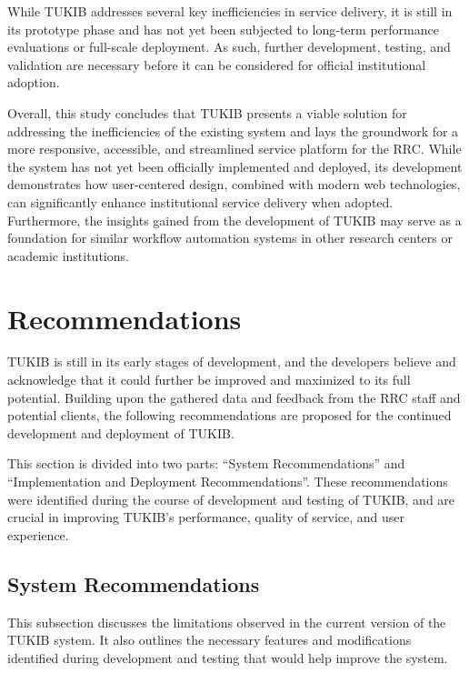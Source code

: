 While TUKIB addresses several key inefficiencies in service delivery, it is still in its prototype phase and has not yet been subjected to long-term performance evaluations or full-scale deployment. As such, further development, testing, and validation are necessary before it can be considered for official institutional adoption.

Overall, this study concludes that TUKIB presents a viable solution for addressing the inefficiencies of the existing system and lays the groundwork for a more responsive, accessible, and streamlined service platform for the RRC. While the system has not yet been officially implemented and deployed, its development demonstrates how user-centered design, combined with modern web technologies, can significantly enhance institutional service delivery when adopted. Furthermore, the insights gained from the development of TUKIB may serve as a foundation for similar workflow automation systems in other research centers or academic institutions.

\section{Recommendations}

TUKIB is still in its early stages of development, and the developers believe and acknowledge that it could further be improved and maximized to its full potential. Building upon the gathered data and feedback from the RRC staff and potential clients, the following recommendations are proposed for the continued development and deployment of TUKIB. 

This section is divided into two parts: ``System Recommendations'' and ``Implementation and Deployment Recommendations''. These recommendations were identified during the course of development and testing of TUKIB, and are crucial in improving TUKIB's performance, quality of service, and user experience.

\subsection{System Recommendations}

This subsection discusses the limitations observed in the current version of the TUKIB system. It also outlines the necessary features and modifications identified during development and testing that would help improve the system.


